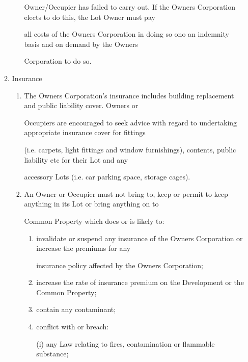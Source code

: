 \documentclass{article}
\begin{document}
\begin{enumerate}[label=\arabic*.]
\begin{enumerate}[label=\arabic{enumi}.\arabic*.]
\begin{enumerate}[label=(\arabic*)]
{\fontsize{10.02}{1}Owner/Occupier has failed to carry out. If the Owners Corporation elects to do this, the Lot Owner must pay }

{\fontsize{10.02}{1}all costs of the Owners Corporation in doing so ono an indemnity basis and on demand by the Owners }

{\fontsize{10.02}{1}Corporation to do so. }

\newpage

\end{enumerate}
\item {\fontsize{9.99}{1} Insurance }

\begin{enumerate}[label=(\arabic*)]
\item {\fontsize{9.962}{1} The Owners Corporation’s insurance includes building replacement and public liability cover. Owners or }

{\fontsize{10.02}{1}Occupiers are encouraged to seek advice with regard to undertaking appropriate insurance cover for fittings }

{\fontsize{10.02}{1}(i.e. carpets, light fittings and window furnishings), contents, public liability etc for their Lot and any }

{\fontsize{10.02}{1}accessory Lots (i.e. car parking space, storage cages). }

\item {\fontsize{9.962}{1} An Owner or Occupier must not bring to, keep or permit to keep anything in its Lot or bring anything on to }

{\fontsize{10.02}{1}Common Property which does or is likely to: }

\begin{enumerate}[label=(\alph*)]
\item {\fontsize{9.962}{1} invalidate or suspend any insurance of the Owners Corporation or increase the premiums for any }

{\fontsize{10.02}{1}insurance policy affected by the Owners Corporation; }

\item {\fontsize{9.962}{1} increase the rate of insurance premium on the Development or the Common Property; }

\item {\fontsize{9.962}{1} contain any contaminant; }

\item {\fontsize{9.962}{1} conflict with or breach: }

{\fontsize{9.962}{1}(i) any Law relating to fires, contamination or flammable substance; }


\end{enumerate}
\end{enumerate}
\end{enumerate}
\end{enumerate}
\end{document}
